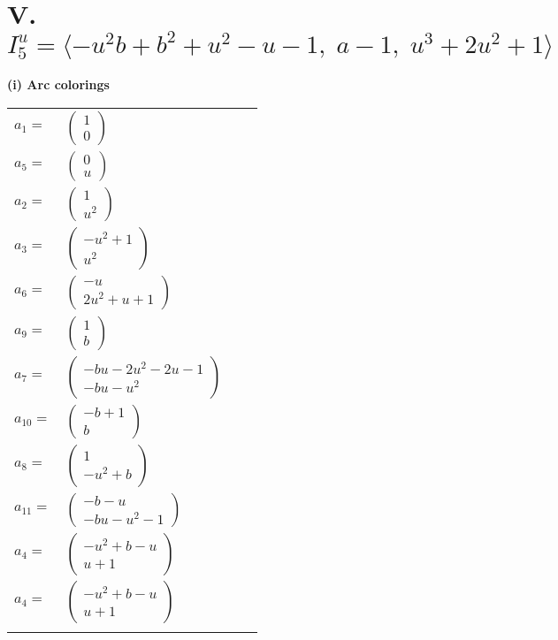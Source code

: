 \documentclass[1p]{elsarticle_modified}
\theoremstyle{definition}
\begin{document}
\centering \section*{V. $I^u_{5}= \langle - u^2 b+b^2+u^2- u-1,\;a-1,\;u^3+2 u^2+1 \rangle$}
\flushleft \textbf{(i) Arc colorings}\\
\begin{tabular}{m{7pt} m{180pt} m{7pt} m{180pt} }
\flushright $a_{1}=$&$\begin{pmatrix}1\\0\end{pmatrix}$ \\
\flushright $a_{5}=$&$\begin{pmatrix}0\\u\end{pmatrix}$ \\
\flushright $a_{2}=$&$\begin{pmatrix}1\\u^2\end{pmatrix}$ \\
\flushright $a_{3}=$&$\begin{pmatrix}- u^2+1\\u^2\end{pmatrix}$ \\
\flushright $a_{6}=$&$\begin{pmatrix}- u\\2 u^2+u+1\end{pmatrix}$ \\
\flushright $a_{9}=$&$\begin{pmatrix}1\\b\end{pmatrix}$ \\
\flushright $a_{7}=$&$\begin{pmatrix}- b u-2 u^2-2 u-1\\- b u- u^2\end{pmatrix}$ \\
\flushright $a_{10}=$&$\begin{pmatrix}- b+1\\b\end{pmatrix}$ \\
\flushright $a_{8}=$&$\begin{pmatrix}1\\- u^2+b\end{pmatrix}$ \\
\flushright $a_{11}=$&$\begin{pmatrix}- b- u\\- b u- u^2-1\end{pmatrix}$ \\
\flushright $a_{4}=$&$\begin{pmatrix}- u^2+b- u\\u+1\end{pmatrix}$\\ \flushright $a_{4}=$&$\begin{pmatrix}- u^2+b- u\\u+1\end{pmatrix}$\\&\end{tabular}
\end{document}
